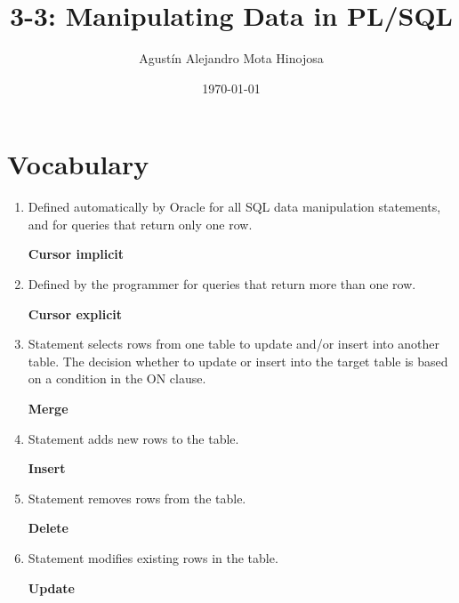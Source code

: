 \documentclass[11pt]{article}
\author{Agustín Alejandro Mota Hinojosa}
\date{\today}
\title{3-3:  Manipulating Data in PL/SQL}
\begin{document}
\maketitle
\tableofcontents

\section{Vocabulary}
\label{sec:org822b710}
\begin{enumerate}
\item Defined automatically by Oracle for all SQL data manipulation statements, and for queries that return only one row.

\textbf{Cursor implicit}

\item Defined by the programmer for queries that return more than one row.

\textbf{Cursor explicit}

\item Statement selects rows from one table to update and/or insert into another table. The decision whether to update or insert into the target table is based on a condition in the ON clause.

\textbf{Merge}

\item Statement adds new rows to the table.

\textbf{Insert}

\item Statement removes rows from the table.

\textbf{Delete}

\item Statement modifies existing rows in the table.

\textbf{Update}
\end{enumerate}
\end{document}
